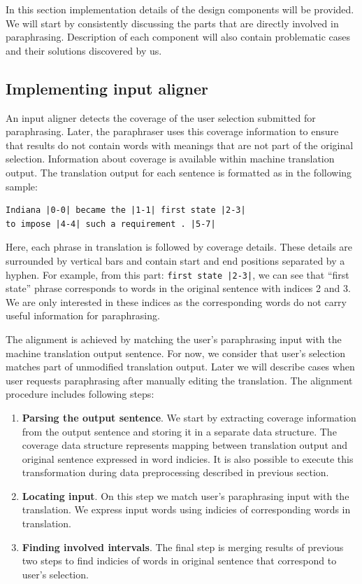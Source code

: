 In this section implementation details of the design components will be provided. We will start by consistently discussing the parts that are directly involved in paraphrasing. Description of each component will also contain problematic cases and their solutions discovered by us. 

\subsection{Implementing input aligner}

An input aligner detects the coverage of the user selection submitted for paraphrasing. Later, the paraphraser uses this coverage information to ensure that results do not contain words with meanings that are not part of the original selection. Information about coverage is available within machine translation output. The translation output for each sentence is formatted as in the following sample:

\begin{verbatim}
Indiana |0-0| became the |1-1| first state |2-3| 
to impose |4-4| such a requirement . |5-7|
\end{verbatim}

Here, each phrase in translation is followed by coverage details. These details are surrounded by vertical bars and contain start and end positions separated by a hyphen. For example, from this part: \texttt{first state |2-3|}, we can see that ``first state'' phrase corresponds to words in the original sentence with indices 2 and 3. We are only interested in these indices as the corresponding words do not carry useful information for paraphrasing.

The alignment is achieved by matching the user's paraphrasing input with the machine translation output sentence. For now, we consider that user's selection matches part of unmodified translation output. Later we will describe cases when user requests paraphrasing after manually editing the translation. The alignment procedure includes following steps:

\begin{enumerate}
  \item \textbf{Parsing the output sentence}. We start by extracting coverage information from the output sentence and storing it in a separate data structure. The coverage data structure represents mapping between translation output and original sentence expressed in word indicies. It is also possible to execute this transformation during data preprocessing described in previous section. 
  \item \textbf{Locating input}. On this step we match user's paraphrasing input with the translation. We express input words using indicies of corresponding words in translation.
  \item \textbf{Finding involved intervals}. The final step is merging results of previous two steps to find indicies of words in original sentence that correspond to user's selection. 
\end{enumerate}

